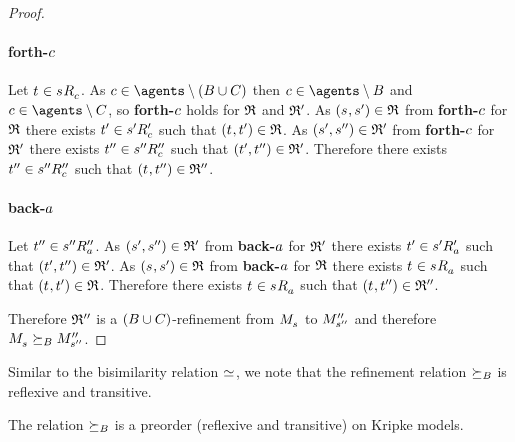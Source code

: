 \begin{proof}
\paragraph{forth-$c$}
Let $\kStateT \in \kSuccessorsC{\kStateS}$.
As $\agentC \in \agents \setminus (\agentsB \cup \agentsC)$ then $\agentC \in \agents \setminus \agentsB$ and $\agentC \in \agents \setminus \agentsC$, so {\bf forth-$c$} holds for $\mathfrak{R}$ and $\mathfrak{R}'$.
As $(\kStateS, \kStateSP) \in \refinement$ from {\bf forth-$c$} for $\mathfrak{R}$ there exists ${t}^{\prime} \in {{s}^{\prime}} {R^{\prime}_{c}}$ such that $(\kStateT, \kStateTP) \in \refinement$.
As $({s}^{\prime}, {s}^{\prime\prime}) \in \mathfrak{R}'$ from {\bf forth-$c$} for $\mathfrak{R}'$ there exists ${t}^{\prime\prime} \in {{s}^{\prime\prime}} {R^{\prime\prime}_{c}}$ such that $({t}^{\prime}, {t}^{\prime\prime}) \in \mathfrak{R}'$.
Therefore there exists ${t}^{\prime\prime} \in {{s}^{\prime\prime}} {R^{\prime\prime}_{c}}$ such that $(\kStateT, \kStateTPP) \in \refinement''$.

\paragraph{back-$a$}
Let ${t}^{\prime\prime} \in {{s}^{\prime\prime}} {R^{\prime\prime}_{a}}$.
As $({s}^{\prime}, {s}^{\prime\prime}) \in \mathfrak{R}'$ from {\bf back-$a$} for $\mathfrak{R}'$ there exists ${t}^{\prime} \in {{s}^{\prime}} {R^{\prime}_{a}}$ such that $({t}^{\prime}, {t}^{\prime\prime}) \in \mathfrak{R}'$.
As $(\kStateS, \kStateSP) \in \refinement$ from {\bf back-$a$} for $\mathfrak{R}$ there exists $\kStateT \in \kSuccessorsA{\kStateS}$ such that $(\kStateT, \kStateTP) \in \refinement$.
Therefore there exists $\kStateT \in \kSuccessorsA{\kStateS}$ such that $(\kStateT, \kStateTPP) \in \refinement''$.

Therefore $\mathfrak{R}''$ is a $(B \cup C)$-refinement from $\kPModel{\kStateS}$ to ${M^{\prime\prime}_{{s}^{\prime\prime}}}$ and therefore $\kPModel{\kStateS} \simulatesBs \kPModelPP{\kStateSPP}$.
\end{proof}

Similar to the bisimilarity relation $\bisimilar$, we note that the refinement relation $\succeq_{B}$ is reflexive and transitive.

\begin{proposition}\label{refinements-preorder}
The relation $\succeq_{B}$ is a preorder (reflexive and transitive) on Kripke models.
\end{proposition}


